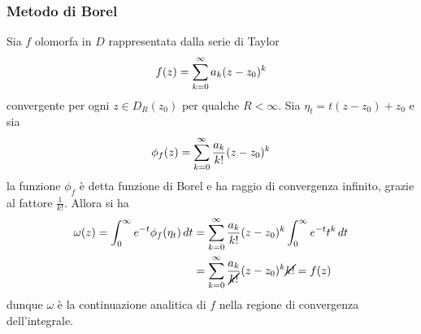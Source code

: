 \documentclass{article}
\begin{document}
\subsubsection{Metodo di Borel}
Sia $f$ olomorfa in $D$ rappresentata dalla serie di Taylor
\begin{gather}
    f(z) = \sum_{k = 0}^\infty a_k(z - z_0)^k \notag
\end{gather}
convergente per ogni $z \in D_R(z_0)$ per qualche $R < \infty$. Sia $\eta_t = t(z - z_0) + z_0$ e sia
\begin{gather}
    \phi_f(z) = \sum_{k = 0}^\infty \frac{a_k}{k!}(z - z_0)^k \notag
\end{gather}
la funzione $\phi_f$ è detta funzione di Borel e ha raggio di convergenza infinito, grazie al fattore $\frac{1}{k!}$. Allora si ha
\begin{align}
    \omega(z) = \int_0^\infty e^{-t}\phi_f(\eta_t) \, dt &= \sum_{k = 0}^\infty \frac{a_k}{k!}(z - z_0)^k\int_0^\infty e^{-t}t^k \, dt \notag \\
    &= \sum_{k = 0}^\infty \frac{a_k}{\cancel{k!}}(z - z_0)^k \cancel{k!} = f(z) \notag
\end{align}
dunque $\omega$ è la continuazione analitica di $f$ nella regione di convergenza dell'integrale. 

\newpage
\end{document}
